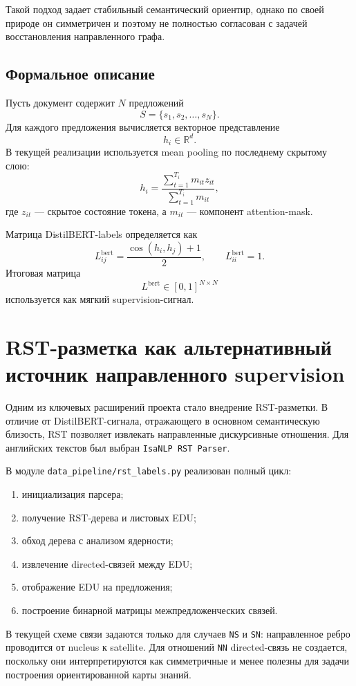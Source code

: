 \documentclass[12pt,a4paper]{article}
\begin{document}
Такой подход задает стабильный семантический ориентир, однако по своей природе он симметричен и поэтому не полностью согласован с задачей восстановления направленного графа.

\subsection{Формальное описание}

Пусть документ содержит $N$ предложений
\[
S = \{s_1, s_2, \dots, s_N\}.
\]
Для каждого предложения вычисляется векторное представление
\[
h_i \in \mathbb{R}^{d}.
\]
В текущей реализации используется mean pooling по последнему скрытому слою:
\[
h_i = \frac{\sum_{t=1}^{T_i} m_{it} z_{it}}{\sum_{t=1}^{T_i} m_{it}},
\]
где $z_{it}$ --- скрытое состояние токена, а $m_{it}$ --- компонент attention-mask.

Матрица DistilBERT-labels определяется как
\[
L^{\text{bert}}_{ij} = \frac{\cos(h_i, h_j)+1}{2},
\qquad
L^{\text{bert}}_{ii}=1.
\]
Итоговая матрица
\[
L^{\text{bert}} \in [0,1]^{N \times N}
\]
используется как мягкий supervision-сигнал.

\section{RST-разметка как альтернативный источник направленного supervision}

Одним из ключевых расширений проекта стало внедрение RST-разметки. В отличие от DistilBERT-сигнала, отражающего в основном семантическую близость, RST позволяет извлекать направленные дискурсивные отношения. Для английских текстов был выбран \texttt{IsaNLP RST Parser}.

В модуле \texttt{data\_pipeline/rst\_labels.py} реализован полный цикл:

\begin{enumerate}
    \item инициализация парсера;
    \item получение RST-дерева и листовых EDU;
    \item обход дерева с анализом ядерности;
    \item извлечение directed-связей между EDU;
    \item отображение EDU на предложения;
    \item построение бинарной матрицы межпредложенческих связей.
\end{enumerate}

В текущей схеме связи задаются только для случаев \texttt{NS} и \texttt{SN}: направленное ребро проводится от nucleus к satellite. Для отношений \texttt{NN} directed-связь не создается, поскольку они интерпретируются как симметричные и менее полезны для задачи построения ориентированной карты знаний.
\end{document}
